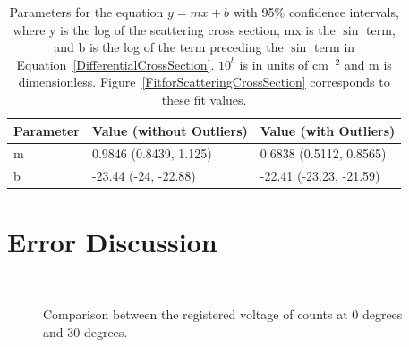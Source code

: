 \begin{table}[h]
\begin{tabular}{|l|l|l|}
\hline
Parameter  & Value (without Outliers) & Value (with Outliers)   \\ \hline \hline
m               & 0.9846  (0.8439, 1.125)   & 0.6838  (0.5112, 0.8565)    \\
b               & -23.44  (-24, -22.88)     &  -22.41  (-23.23, -21.59) \\ \hline
\end{tabular}
\caption{Parameters for the equation $y=mx+b$ with 95$\%$ confidence intervals, where y is the log of the scattering cross section, mx is the $\sin$ term, and b is the log of the term preceding the $\sin$ term in Equation~\ref{DifferentialCrossSection}. $10^b$ is in units of cm$^{-2}$ and m is dimensionless. Figure~\ref{FitforScatteringCrossSection} corresponds to these fit values.}
\label{CurveFitValues}
\end{table}

\section{Error Discussion}

\begin{figure}[tt]
  \begin{center}
     \\
  \end{center}
  \caption{Comparison between the registered voltage of counts at 0 degrees and 30 degrees.}
  \label{Noise}
\end{figure}

